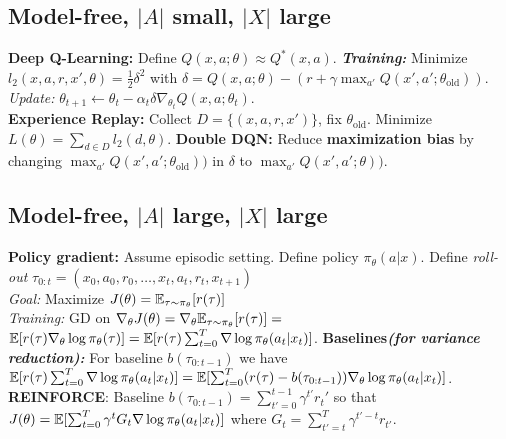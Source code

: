 \subsection{Model-free, $|A|$ small, $|X|$ large}
\textbf{Deep Q-Learning:} Define $Q(x,a;\theta) \approx Q^*(x,a)$.
\textbf{\emph{Training:}} Minimize $ l_2(x,a,r,x',\theta) = \frac{1}{2}\delta^2$ with $\delta = Q(x,a;\theta) - (r+\gamma\max_{a'}Q(x',a';\theta_\mathrm{old}))$.\\
\emph{Update:} $\theta_{t+1} \leftarrow \theta_t - \alpha_t\delta\nabla_{\theta_t}Q(x,a;\theta_t)$.\\
\textbf{Experience Replay:} Collect $D=\{(x,a,r,x')\}$, fix $\theta_\mathrm{old}$. Minimize $L(\theta) = \sum_{d\in D}l_2(d,\theta)$.
\textbf{Double DQN:} Reduce \textbf{maximization bias} by changing $\max_{a'}Q(x',a';\theta_\mathrm{old}))$ in $\delta$ to $\max_{a'}Q(x',a';\theta))$. 

\subsection{Model-free, $|A|$ large, $|X|$ large}
\textbf{Policy gradient:} Assume episodic setting. Define policy $\pi_\theta(a|x)$. Define \emph{roll-out} $\tau_{0:t}=(x_0,a_0,r_0,\ldots,x_t,a_t,r_t,x_{t+1})$\\
\emph{Goal:} Maximize $J(\theta) = \mathbb{E}_{\tau\sim\pi_\theta}[r(\tau)]$\\
\emph{Training:} GD on $\nabla_\theta J(\theta) = \nabla_\theta \mathbb{E}_{\tau\sim\pi_\theta}[r(\tau)] = $\\$\mathbb{E}[r(\tau)\nabla_\theta\log\pi_\theta(\tau)] = \mathbb{E}[r(\tau)\sum_{t=0}^T\nabla\log\pi_\theta(a_t|x_t)]$.
\textbf{Baselines\textnormal{\emph{(for variance reduction):}}}
For baseline $b(\tau_{0:t-1})$ we have $\mathbb{E}[r(\tau)\sum_{t=0}^T\nabla\log\pi_\theta(a_t|x_t)] = \mathbb{E}[\sum_{t=0}^T(r(\tau)-b(\tau_{0:t-1}))\nabla_\theta\log\pi_\theta(a_t|x_t)]$.\\
\textbf{REINFORCE}: Baseline $b(\tau_{0:t-1}) = \sum_{t'=0}^{t-1} \gamma^{t'}r_t'$ so that $J(\theta) = \mathbb{E}[\sum_{t=0}^T\gamma^t G_t\nabla\log\pi_\theta(a_t|x_t)]$ where $G_t = \sum_{t'=t}^T\gamma^{t'-t}r_{t'}$.

